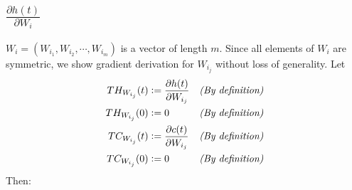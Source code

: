 \documentclass[twoside,11pt]{article}
\begin{document}
\subsection{$\frac{\partial h(t)}{\partial W_{i}}$}

$W_i = (W_{i_1}, W_{i_2}, \cdots, W_{i_m})$ is a vector of length $m$. Since all elements of $W_i$ are symmetric, we show gradient derivation for $W_{i_j}$ without loss of generality. Let
\begin{align}
TH_{W_{i_j}}(t)  & \vcentcolon = \frac{\partial h(t)}{\partial W_{i_j}}  && \textit{(By definition)} \label{def1} \\
TH_{W_{i_j}}(0)  & \vcentcolon = 0  && \textit{(By definition)} \label{def2} \\
TC_{W_{i_j}}(t)  & \vcentcolon = \frac{\partial c(t)}{\partial W_{i_j}}  && \textit{(By definition)} \label{def3} \\
TC_{W_{i_j}}(0)  & \vcentcolon = 0  && \textit{(By definition)}  \label{def4}
\end{align}
Then:
\end{document}
